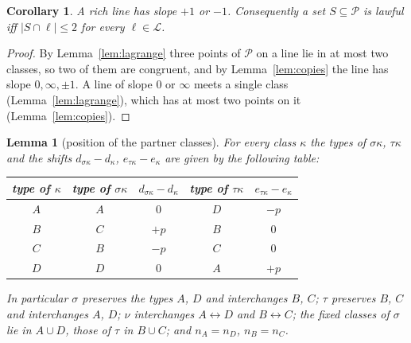 \documentclass[11pt]{article}
\newtheorem{lemma}[theorem]{Lemma}
\newtheorem{corollary}[theorem]{Corollary}
\theoremstyle{remark}
\newcommand{\Lc}{\mathcal{L}}
\newcommand{\Pset}{\mathcal{P}}
\begin{document}
\begin{corollary}\label{cor:slopes}
A rich line has slope $+1$ or $-1$.  Consequently a set $S\subseteq\Pset$ is lawful iff $|S\cap\ell|\le2$ for every
$\ell\in\Lc$.
\end{corollary}

\begin{proof}
By Lemma~\ref{lem:lagrange} three points of $\Pset$ on a line lie in at most two classes, so two of them are congruent,
and by Lemma~\ref{lem:copies} the line has slope $0,\infty,\pm1$.  A line of slope $0$ or $\infty$ meets a single class
(Lemma~\ref{lem:lagrange}), which has at most two points on it (Lemma~\ref{lem:copies}).
\end{proof}

\begin{lemma}[position of the partner classes]\label{lem:partners}
For every class $\kappa$ the types of $\sigma\kappa$, $\tau\kappa$ and the shifts $d_{\sigma\kappa}-d_\kappa$,
$e_{\tau\kappa}-e_\kappa$ are given by the following table:
\begin{center}
\begin{tabular}{c|cc|cc}
\toprule
type of $\kappa$ & type of $\sigma\kappa$ & $d_{\sigma\kappa}-d_\kappa$ & type of $\tau\kappa$ & $e_{\tau\kappa}-e_\kappa$\\
\midrule
$A$ & $A$ & $0$ & $D$ & $-p$\\
$B$ & $C$ & $+p$ & $B$ & $0$\\
$C$ & $B$ & $-p$ & $C$ & $0$\\
$D$ & $D$ & $0$ & $A$ & $+p$\\
\bottomrule
\end{tabular}
\end{center}
In particular $\sigma$ preserves the types $A$, $D$ and interchanges $B$, $C$; $\tau$ preserves $B$, $C$ and
interchanges $A$, $D$; $\nu$ interchanges $A\leftrightarrow D$ and $B\leftrightarrow C$; the fixed classes of $\sigma$
lie in $A\cup D$, those of $\tau$ in $B\cup C$; and $n_A=n_D$, $n_B=n_C$.
\end{lemma}
\end{document}
